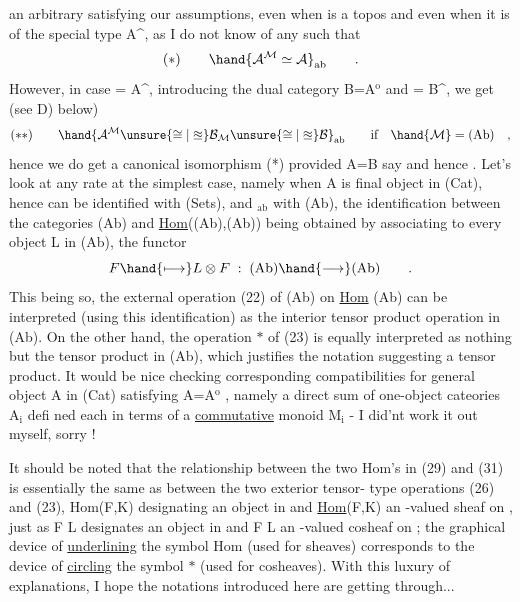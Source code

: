 an arbitrary  satisfying our assumptions, even when  is a topos and
even when it is of the special type A\^{}, as I do not know of any  such
that
\[ (*) \qquad \hand{\mathcal{A}^{\mathcal{M}}\simeq\mathcal{A}}_{\mathrm{ab}} \qquad . \]
However, in case  = A\^{}, introducing the dual category B=A$^{\mathrm{o}}$ and  = B\^{},
we get (see D) below)
\[ (**) \qquad \hand{\mathcal{A}^{\mathcal{M}} \unsure{\cong|\approxeq} \mathcal{B}_{\mathcal{M}} \unsure{\cong|\approxeq} \mathcal{B}}_{\mathrm{ab}} \qquad \text{if} \quad \hand{\mathcal{M}} = \text{(Ab)} \quad , \]
hence we do get a canonical isomorphism  (*) provided A=B say
and hence  . Let's look at any rate at the simplest case, namely
when A is  final object in (Cat), hence  can be identified with
(Sets), and $_{\mathrm{ab}}$ with (Ab), the identification between the categories
 (Ab) and \uline{Hom}\hand{$_!$}((Ab),(Ab)) being obtained  by associating
to every object L in (Ab), the functor
\[ F \hand{\longmapsto} L\otimes F \; : \; \text{(Ab)} \hand{\longrightarrow} \text{(Ab)} \qquad . \]
This being so, the external operation (22) of (Ab) on \uline{Hom}\hand{$_!$} \hand{$\cong$} (Ab)
can be interpreted (using this identification) as the interior tensor
product operation in (Ab). On the other hand, the operation $*$ of (23)
is equally interpreted as nothing but the tensor product in (Ab), which
justifies the notation suggesting a tensor product. It would be nice
checking corresponding compatibilities for  general object A in (Cat)
satisfying A=A$^{\mathrm{o}}$ , namely a direct sum of one-object cateories A$_{\mathrm{i}}$ defi%
ned each in terms of a \uline{commutative} monoid M$_{\mathrm{i}}$ - I did'nt work it out
myself, sorry !

It should be noted that the relationship between the two  Hom's in
(29) and (31) is essentially the same as between the two exterior tensor-
type operations (26) and (23), Hom(F,K) designating an object in  and
\margin{$*$} \uline{Hom}(F,K) an -valued sheaf on , just as F \hand{$*$} L designates an object
\margin{$\circledast$}  in  and F \hand{$\circledast$} L an -valued cosheaf on ; the graphical device of
\uline{underlining} the symbol Hom (used for sheaves) corresponds to the device
\margin{$*$} of \uline{circling} the symbol $*$ (used for cosheaves). With this luxury of
explanations, I hope the notations introduced here are getting through...

